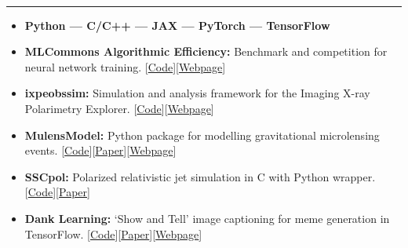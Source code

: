 \documentclass[11pt, oneside]{article}
\newenvironment{ressection}[1]{
	\vspace{4pt}
	{\selectfont\Large\color{Mycolor2}{\textbf{#1}}}
	\vspace{-6.5pt} \\
	\textcolor{Mycolor2}{\rule{\textwidth}{0.7pt}}
	\begin{itemize}
	\vspace{3pt}
}{
	\end{itemize}
}
\newcommand{\resitem}[1]{
	\vspace{-4pt}
	\item[] \begin{flushleft} #1 \end{flushleft}
}
\begin{document}
\begin{ressection}{\textbf{Open Source} ($\bigstar$1000+)}

	\resitem{\textbf{\textcolor{Mycolor2}{Python --- C/C++ --- JAX --- PyTorch --- TensorFlow}}}

	\vspace{4pt}
	\resitem{\textbf{MLCommons Algorithmic Efficiency:} Benchmark and competition for neural network training. [\href{https://github.com/mlcommons/algorithmic-efficiency}{Code}][\href{https://mlcommons.org/en/groups/research-algorithms/}{Webpage}]}

    \vspace{2pt}
	\resitem{\textbf{ixpeobssim:} Simulation and analysis framework for the Imaging X-ray Polarimetry Explorer. [\href{https://github.com/lucabaldini/ixpeobssim}{Code}][\href{https://ixpeobssim.readthedocs.io/en/latest/index.html}{Webpage}]}

    \vspace{2pt}
	\resitem{\textbf{MulensModel:}  Python package for modelling gravitational microlensing events. [\href{https://github.com/rpoleski/MulensModel}{Code}][\href{https://arxiv.org/abs/2201.01110}{Paper}][\href{https://rpoleski.github.io/MulensModel/}{Webpage}]}

	\vspace{2pt}
	\resitem{\textbf{SSCpol:}  Polarized relativistic jet simulation in C with Python wrapper. [\href{https://github.com/alpv95/SSCpol}{Code}][\href{https://ui.adsabs.harvard.edu/abs/2019ApJ...885...76P/abstract}{Paper}]}

	\vspace{2pt}
	\resitem{\textbf{Dank Learning:} `Show and Tell' image captioning for meme generation in TensorFlow. [\href{https://github.com/alpv95/Dank-Learning}{Code}][\href{https://arxiv.org/abs/1806.04510}{Paper}][\href{https://danklearning.com/}{Webpage}]}

\end{ressection}



\newpage
\end{document}
